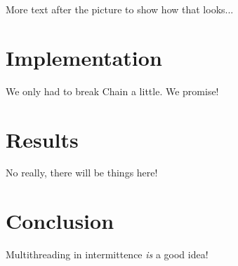 \documentclass[11pt]{sensys-proc}
\newcommand{\chain}{Chain\xspace}
\begin{document}
More text after the picture to show how that looks...


\section{Implementation}
We only had to break \chain a little. We promise!


\section{Results}
No really, there will be things here!


\section{Conclusion}
Multithreading in intermittence {\em is} a good idea!


\balance

\end{document}

